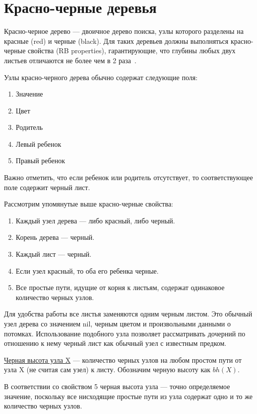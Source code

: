 	\section{Красно-черные деревья}
		Красно-черное дерево --- двоичное дерево поиска, узлы которого 
		разделены на красные (red) и черные (black). Для таких деревьев
		должны выполняться красно-черные свойства (RB properties), 
		гарантирующие, что глубины любых двух листьев отличаются не более
		чем в 2 раза~\cite{kormen}.

		Узлы красно-черного дерева обычно содержат следующие поля:
		\begin{enumerate}
			\item Значение
			\item Цвет
			\item Родитель
			\item Левый ребенок
			\item Правый ребенок
		\end{enumerate}	

		Важно отметить, что если ребенок или родитель отсутствует, то
		соответствующее поле содержит черный лист.
		
		Рассмотрим упомянутые выше красно-черные свойства:
		\begin{enumerate}
			\item Каждый узел дерева --- либо красный, либо черный.
			\item Корень дерева --- черный.
			\item Каждый лист --- черный.
			\item Если узел красный, то оба его ребенка черные.
			\item Все простые пути, идущие от корня к листьям, содержат 
				  одинаковое количество черных узлов.
		\end{enumerate}
		
		Для удобства работы все листья заменяются одним черным листом.
		Это обычный узел дерева со значением nil, черным цветом и произвольными данными
		о потомках. Использование подобного узла позволяет рассматривать дочерний 
		по отношению к нему черный лист как обычный узел с известным предком.
		
		\underline{Черная высота узла X} --- количество черных узлов на любом простом 
		пути от узла X (не считая сам узел) к листу. Обозначим черную высоту
		как $bh(X)$.

		В соответствии со свойством 5 черная высота узла --- точно определяемое значение,
		поскольку все нисходящие простые пути из узла содержат одно и то же 
		количество черных узлов.

